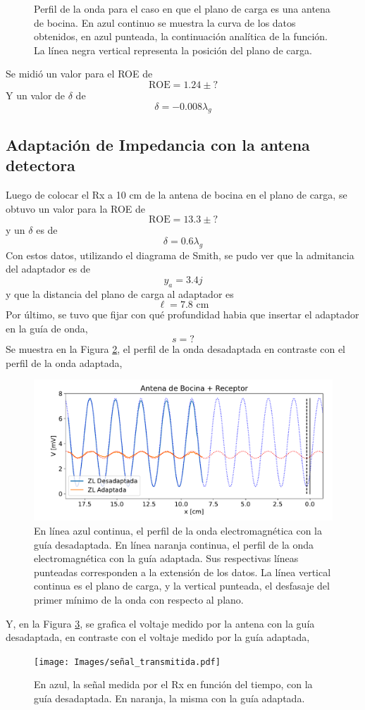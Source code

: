 \documentclass[11pt,a4paper]{article}
\begin{document}
\begin{multicols}{2}
\begin{figure}[H]
    \caption{Perfil de la onda para el caso en que el plano de carga es una antena de bocina. En azul continuo se muestra la curva de los datos obtenidos, en azul punteada, la continuación analítica de la función. La línea negra vertical representa la posición del plano de carga.}
    \label{fig:bocina}
\end{figure}
Se midió un valor para el ROE de
$$
\text{ROE} = 1.24\pm?
$$
Y un valor de $\delta$ de
$$
\delta = -0.008\lambda_g
$$
\subsection{Adaptación de Impedancia con la antena detectora}
Luego de colocar el Rx a 10 cm de la antena de bocina en el plano de carga, se obtuvo un valor para la ROE de
$$
\text{ROE} = 13.3\pm?
$$
y un $\delta$ es de
$$
\delta = 0.6\lambda_g
$$
Con estos datos, utilizando el diagrama de Smith, se pudo ver que la admitancia del adaptador es de
$$
y_a = 3.4j
$$
y que la distancia del plano de carga al adaptador es
$$
\ell = 7.8 \text{ cm}
$$
Por último, se tuvo que fijar con qué profundidad habia que insertar el adaptador en la guía de onda,
$$
s = ?
$$
Se muestra en la Figura \ref{fig:bocirec}, el perfil de la onda desadaptada en contraste con el perfil de la onda adaptada,
\begin{figure}[H]
    \centering
    \includegraphics[width=\linewidth]{Images/bocina_receptor.pdf}
    \caption{En línea azul continua, el perfil de la onda electromagnética con la guía desadaptada. En línea naranja continua, el perfil de la onda electromagnética con la guía adaptada. Sus respectivas líneas punteadas corresponden a la extensión de los datos. La línea vertical continua es el plano de carga, y la vertical punteada, el desfasaje del primer mínimo de la onda con respecto al plano.}
    \label{fig:bocirec}
\end{figure}
Y, en la Figura \ref{fig:senal}, se grafica el voltaje medido por la antena con la guía desadaptada, en contraste con el voltaje medido por la guía adaptada,
\begin{figure}[H]
    \centering
    \texttt{[image: Images/señal\_transmitida.pdf]}
    \caption{En azul, la señal medida por el Rx en función del tiempo, con la guía desadaptada. En naranja, la misma con la guía adaptada.}
    \label{fig:senal}
\end{figure}

\end{multicols}
\end{document}
